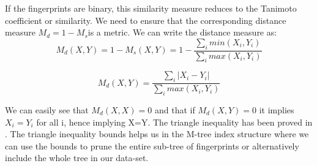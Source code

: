 If the fingerprints are binary, this similarity measure reduces to the Tanimoto coefficient or similarity. We need to ensure that the corresponding distance measure $M_d=1- M_s$is a metric. We can write the distance measure as:\\
\begin{equation}
 M_d(X,Y) = 1- M_s(X,Y) = 1- \frac{\sum \limits_{i} min(X_i, Y_i)}{\sum \limits_{i} max(X_i, Y_i)}
\end{equation} 

\begin{equation}
 M_d(X,Y)= \frac{\sum \limits_{i} |X_i - Y_i|}{\sum \limits_{i} max(X_i, Y_i)}
\end{equation} 

We can easily see that $M_d(X,X)=0$ and that if $M_d(X,Y)=0 $ it implies $X_i = Y_i$ for all i, hence implying X=Y. The triangle inequality has been proved in \citet*{lipkus1999proof}. The triangle inequality bounds helps us in the M-tree index structure where we can use the bounds to prune the entire sub-tree of fingerprints or alternatively include the whole tree in our data-set.\\

